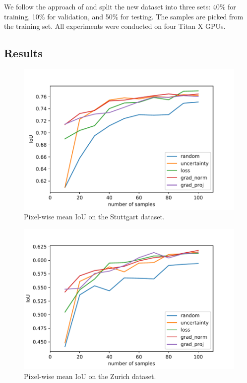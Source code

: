\documentclass[letterpaper, 10 pt, conference]{ieeeconf}  %
\begin{document}
We follow the approach of \cite{milioto2018real} and split the new dataset into three sets: 40\% for training, 10\% for validation, and 50\% for testing. The samples are picked from the training set. All experiments were conducted on four Titan X GPUs.  

\subsection{Results}


    \begin{figure}
	\vspace{1em} 
    \centering
    \includegraphics[width=\linewidth]{pics/pw_iou_stuttgart.pdf}
   		\caption{Pixel-wise mean IoU on the Stuttgart dataset.}
		\label{fig:iou_stuttgart}    		
   \end{figure}
   
    \begin{figure}
    \centering
    \includegraphics[width=\linewidth]{pics/pw_iou_zurich.pdf}
   		\caption{Pixel-wise mean IoU on the Zurich dataset.}
		\label{fig:iou_zurich}    		
   \end{figure}
   
\end{document}
